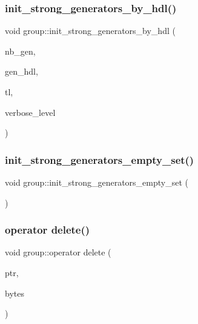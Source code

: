 \subsubsection{\texorpdfstring{init\+\_\+strong\+\_\+generators\+\_\+by\+\_\+hdl()}{init\_strong\_generators\_by\_hdl()}}
{\footnotesize\ttfamily void group\+::init\+\_\+strong\+\_\+generators\+\_\+by\+\_\+hdl (\begin{DoxyParamCaption}\item[{\mbox{\hyperlink{galois_8h_a09fddde158a3a20bd2dcadb609de11dc}{I\+NT}}}]{nb\+\_\+gen,  }\item[{\mbox{\hyperlink{galois_8h_a09fddde158a3a20bd2dcadb609de11dc}{I\+NT}} $\ast$}]{gen\+\_\+hdl,  }\item[{\mbox{\hyperlink{galois_8h_a09fddde158a3a20bd2dcadb609de11dc}{I\+NT}} $\ast$}]{tl,  }\item[{\mbox{\hyperlink{galois_8h_a09fddde158a3a20bd2dcadb609de11dc}{I\+NT}}}]{verbose\+\_\+level }\end{DoxyParamCaption})}

\mbox{\label{classgroup_a2bce2962b39ee6eac224ed32a174607c}} 
\subsubsection{\texorpdfstring{init\+\_\+strong\+\_\+generators\+\_\+empty\+\_\+set()}{init\_strong\_generators\_empty\_set()}}
{\footnotesize\ttfamily void group\+::init\+\_\+strong\+\_\+generators\+\_\+empty\+\_\+set (\begin{DoxyParamCaption}{ }\end{DoxyParamCaption})}

\mbox{\label{classgroup_ae380168e077611192c14587fdce90a08}} 
\subsubsection{\texorpdfstring{operator delete()}{operator delete()}}
{\footnotesize\ttfamily void group\+::operator delete (\begin{DoxyParamCaption}\item[{void $\ast$}]{ptr,  }\item[{size\+\_\+t}]{bytes }\end{DoxyParamCaption})}

